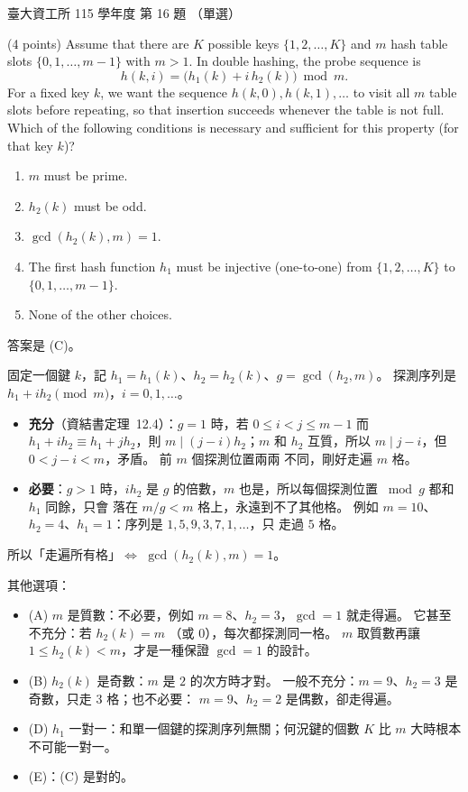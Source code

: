 \begin{pastexam}[label={px:ntu-115-dsa-16}]{臺大資工所 115 學年度 第 16 題}
（單選）

(4 points) Assume that there are $K$ possible keys $\{1,2,\ldots,K\}$ and $m$ hash table slots $\{0,1,\ldots,m-1\}$ with $m>1$. In double hashing, the probe sequence is
\[ h(k,i)=\bigl(h_1(k)+i\,h_2(k)\bigr)\bmod m. \]
For a fixed key $k$, we want the sequence $h(k,0),h(k,1),\ldots$ to visit all $m$ table slots before repeating, so that insertion succeeds whenever the table is not full. Which of the following conditions is necessary and sufficient for this property (for that key $k$)?


\begin{enumerate}[label=(\Alph*)]
\item $m$ must be prime.
\item $h_2(k)$ must be odd.
\item $\gcd(h_2(k),m)=1$.
\item The first hash function $h_1$ must be injective (one-to-one) from $\{1,2,\ldots,K\}$ to $\{0,1,\ldots,m-1\}$.
\item None of the other choices.
\end{enumerate}
\end{pastexam}

\begin{pastsoln}
答案是 (C)。

固定一個鍵 $k$，記 $h_1 = h_1(k)$、$h_2 = h_2(k)$、$g = \gcd(h_2, m)$。 探測序列是 $h_1 + i h_2 \pmod m$，$i = 0, 1, \ldots$。
\begin{itemize}
\item \textbf{充分}（資結書定理~12.4）：$g = 1$ 時，若 $0 \le i < j \le m - 1$ 而 $h_1 + i h_2 \equiv h_1 + j h_2$，則
$m \mid (j - i) h_2$；$m$ 和 $h_2$ 互質，所以 $m \mid j - i$，但 $0 < j - i < m$，矛盾。 前 $m$ 個探測位置兩兩
不同，剛好走遍 $m$ 格。
\item \textbf{必要}：$g > 1$ 時，$i h_2$ 是 $g$ 的倍數，$m$ 也是，所以每個探測位置 $\bmod g$ 都和 $h_1$ 同餘，只會
落在 $m/g < m$ 格上，永遠到不了其他格。 例如 $m = 10$、$h_2 = 4$、$h_1 = 1$：序列是 $1, 5, 9, 3, 7, 1, \ldots$，只
走過 $5$ 格。
\end{itemize}
所以「走遍所有格」$\iff$ $\gcd(h_2(k), m) = 1$。

其他選項：
\begin{itemize}
\item (A) $m$ 是質數：不必要，例如 $m = 8$、$h_2 = 3$，$\gcd = 1$ 就走得遍。 它甚至不充分：若 $h_2(k) = m$
（或 $0$），每次都探測同一格。 $m$ 取質數再讓 $1 \le h_2(k) < m$，才是一種保證 $\gcd = 1$ 的設計。
\item (B) $h_2(k)$ 是奇數：$m$ 是 $2$ 的次方時才對。 一般不充分：$m = 9$、$h_2 = 3$ 是奇數，只走 $3$ 格；也不必要：
$m = 9$、$h_2 = 2$ 是偶數，卻走得遍。
\item (D) $h_1$ 一對一：和單一個鍵的探測序列無關；何況鍵的個數 $K$ 比 $m$ 大時根本不可能一對一。
\item (E)：(C) 是對的。
\end{itemize}
\end{pastsoln}

